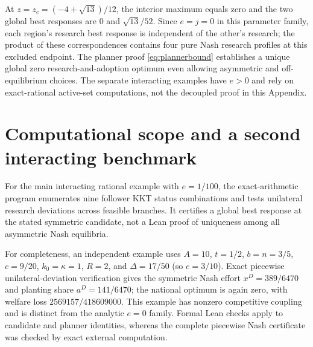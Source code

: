 \documentclass[11pt,a4paper]{article}
\begin{document}
At $z=z_c=(-4+\sqrt{13})/12$, the interior maximum equals zero and the two global best responses are $0$ and $\sqrt{13}/52$. Since $e=j=0$ in this parameter family, each region's research best response is independent of the other's research; the product of these correspondences contains four pure Nash research profiles at this excluded endpoint. The planner proof \eqref{eq:plannerbound} establishes a unique global zero research-and-adoption optimum even allowing asymmetric and off-equilibrium choices. The separate interacting examples have $e>0$ and rely on exact-rational active-set computations, not the decoupled proof in this Appendix.


\section{Computational scope and a second interacting benchmark}
For the main interacting rational example with $e=1/100$, the exact-arithmetic program enumerates nine follower KKT status combinations and tests unilateral research deviations across feasible branches. It certifies a global best response at the stated symmetric candidate, not a Lean proof of uniqueness among all asymmetric Nash equilibria.

For completeness, an independent example uses $A=10$, $t=1/2$, $b=n=3/5$, $c=9/20$, $k_0=\kappa=1$, $R=2$, and $\Delta=17/50$ (so $e=3/10$). Exact piecewise unilateral-deviation verification gives the symmetric Nash effort $x^D=389/6470$ and planting share $a^D=141/6470$; the national optimum is again zero, with welfare loss $2569157/418609000$. This example has nonzero competitive coupling and is distinct from the analytic $e=0$ family. Formal Lean checks apply to candidate and planner identities, whereas the complete piecewise Nash certificate was checked by exact external computation.
\end{document}
